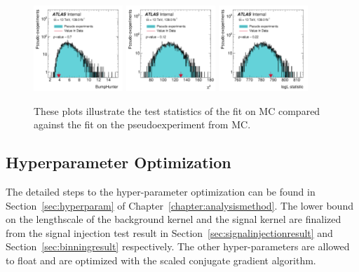 \begin{figure}[!htb]
    \begin{center}
        \includegraphics[width=0.30\textwidth]{figures/chapter_dimuon/bumpHunterStatPlot}        
        \includegraphics[width=0.30\textwidth]{figures/chapter_dimuon/chi2StatPlot}        
        \includegraphics[width=0.30\textwidth]{figures/chapter_dimuon/logLStatPlot}        
        \caption{
        These plots illustrate the test statistics of the fit on MC compared against the fit on the pseudoexperiment from MC. }
        \label{fig:nominalstats}
    \end{center}
\end{figure}
\FloatBarrier


\subsection{Hyperparameter Optimization}
The detailed steps to the hyper-parameter optimization can be found in Section~\ref{sec:hyperparam} of Chapter~\ref{chapter:analysismethod}.
The lower bound on the lengthscale of the background kernel and the signal kernel are finalized from the signal injection test result in Section~\ref{sec:signalinjectionresult} and Section~\ref{sec:binningresult} respectively. The other hyper-parameters are allowed to float and are optimized with the scaled conjugate gradient algorithm. 

